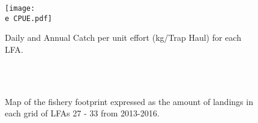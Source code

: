 \documentclass[11pt]{article}
\newcommand{\e}{\string~/bio.data/bio.lobster/figures/LFA2733Framework2018/} %
\begin{document}
\begin{figure}
\centering
    \texttt{[image: \\e CPUE.pdf]}
    \caption{Daily and Annual Catch per unit effort (kg/Trap Haul) for each LFA.}

\end{figure}

        \begin{figure}
        \centering
                \\
                \\
        
         \caption{Map of the fishery footprint expressed as the amount of landings in each grid of LFAs 27 - 33 from 2013-2016.}
        \end{figure}
\end{document}
